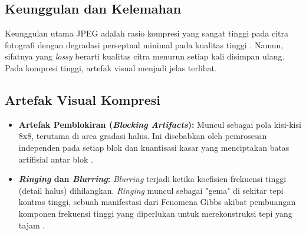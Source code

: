 \documentclass[a4paper]{article}
\begin{document}
\subsection{Keunggulan dan Kelemahan}
Keunggulan utama JPEG adalah rasio kompresi yang sangat tinggi pada citra fotografi dengan degradasi perseptual minimal pada kualitas tinggi \cite{wallace1991jpeg}. Namun, sifatnya yang \textit{lossy} berarti kualitas citra menurun setiap kali disimpan ulang. Pada kompresi tinggi, artefak visual menjadi jelas terlihat.

\subsection{Artefak Visual Kompresi}
\begin{itemize}
  \item \textbf{Artefak Pemblokiran (\textit{Blocking Artifacts}):} Muncul sebagai pola kisi-kisi 8x8, terutama di area gradasi halus. Ini disebabkan oleh pemrosesan independen pada setiap blok dan kuantisasi kasar yang menciptakan batas artifisial antar blok \cite{singh2012blocking, chou1998smoothing}.
  \item \textbf{\textit{Ringing} dan \textit{Blurring}:} \textit{Blurring} terjadi ketika koefisien frekuensi tinggi (detail halus) dihilangkan. \textit{Ringing} muncul sebagai "gema" di sekitar tepi kontras tinggi, sebuah manifestasi dari Fenomena Gibbs akibat pembuangan komponen frekuensi tinggi yang diperlukan untuk merekonstruksi tepi yang tajam \cite{gottlieb1996gibbs, marziliano2004perceptual}.
\end{itemize}

\begin{table}[h!]
  \centering
  \caption{Perbandingan Kualitas vs. Tingkat Kompresi JPEG}
  \label{tab:kualitas_jpeg}
\end{table}
\end{document}
